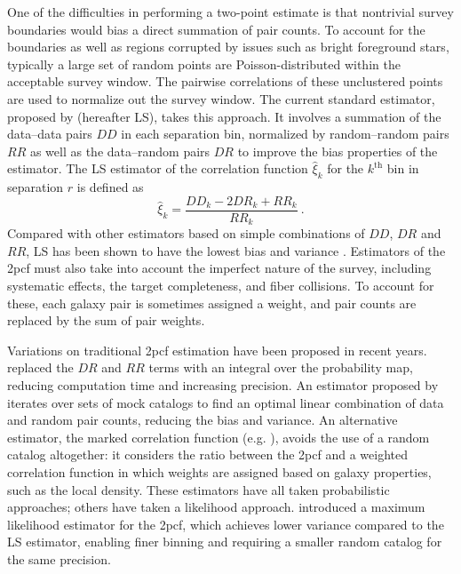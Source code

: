 \documentclass[modern]{aastex62}
\newcommand{\cf}{2pcf\xspace} %
\newcommand{\LS}{LS\xspace}
\begin{document}
One of the difficulties in performing a two-point estimate is that nontrivial survey boundaries would bias a direct summation of pair counts.
To account for the boundaries as well as regions corrupted by issues such as bright foreground stars, typically a large set of random points are Poisson-distributed within the acceptable survey window.
The pairwise correlations of these unclustered points are used to normalize out the survey window.
The current standard estimator, proposed by \cite{LandySzalay1993} (hereafter \LS), takes this approach.
It involves a summation of the data--data pairs $DD$ in each separation bin, normalized by random--random pairs $RR$ as well as the data--random pairs $DR$ to improve the bias properties of the estimator.
The \LS estimator of the correlation function $\hat{\xi}_k$ for the $k^\mathrm{th}$ bin in separation $r$ is defined as
\begin{equation} \label{eq:lsintro}
\hat{\xi}_k = \frac{DD_k - 2DR_k + RR_k}{RR_k} ~.
\end{equation}
Compared with other estimators based on simple combinations of $DD$, $DR$ and $RR$, \LS has been shown to have the lowest bias and variance \citep{Kerscher2000}.
Estimators of the \cf must also take into account the imperfect nature of the survey, including systematic effects, the target completeness, and fiber collisions.
To account for these, each galaxy pair is sometimes assigned a weight, and pair counts are replaced by the sum of pair weights.

Variations on traditional \cf estimation have been proposed in recent years.
\cite{Demina2016} replaced the $DR$ and $RR$ terms with an integral over the probability map, reducing computation time and increasing precision.
An estimator proposed by \cite{VargasMagana2013} iterates over sets of mock catalogs to find an optimal linear combination of data and random pair counts, reducing the bias and variance.
An alternative estimator, the marked correlation function (e.g. \citealt{WhitePadmanabhan2009}), avoids the use of a random catalog altogether: it considers the ratio between the \cf and a weighted correlation function in which weights are assigned based on galaxy properties, such as the local density.
These estimators have all taken probabilistic approaches; others have taken a likelihood approach.
\cite{BaxterRozo2013} introduced a maximum likelihood estimator for the \cf, which achieves lower variance compared to the \LS estimator, enabling finer binning and requiring a smaller random catalog for the same precision.
\end{document}
